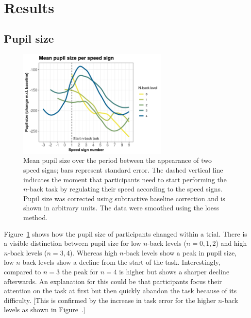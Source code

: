 
\section{Results}\label{sec:results}
\subsection{Pupil size}
\begin{figure}[tp]
  \centering
  \includegraphics[width=7.5cm]{images/speed_sign_nback.png}
  \caption{Mean pupil size over the period between the appearance of two speed signs; bars represent standard error.
  The dashed vertical line indicates the moment that participants need to start performing the \(n\)-back task by regulating their speed according to the speed signs.
  Pupil size was corrected using subtractive baseline correction and is shown in arbitrary units. 
  The data were smoothed using the loess method.}
  \label{fig:ps-speed-sign}
\end{figure}

Figure~\ref{fig:ps-speed-sign} shows how the pupil size of participants changed within a trial.
There is a visible distinction between pupil size for low \(n\)-back levels (\(n = 0,1,2\)) and high \(n\)-back levels (\(n = 3,4\)).
Whereas high \(n\)-back levels show a peak in pupil size, low \(n\)-back levels show a decline from the start of the task.
Interestingly, compared to \(n = 3\) the peak for \(n = 4\) is higher but shows a sharper decline afterwards.
An explanation for this could be that participants focus their attention on the task at first but then quickly abandon the task because of its difficulty.
[This is confirmed by the increase in task error for the higher \(n\)-back levels as shown in Figure~.]

